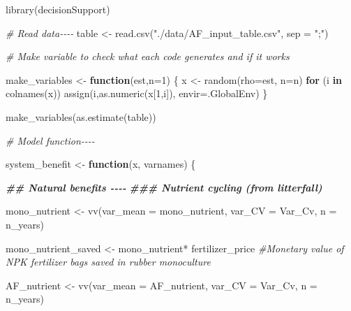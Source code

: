 \documentclass[
]{article}
\newenvironment{Shaded}{\begin{snugshade}}{\end{snugshade}}
\newcommand{\AttributeTok}[1]{\textcolor[rgb]{0.77,0.63,0.00}{#1}}
\newcommand{\CommentTok}[1]{\textcolor[rgb]{0.56,0.35,0.01}{\textit{#1}}}
\newcommand{\ControlFlowTok}[1]{\textcolor[rgb]{0.13,0.29,0.53}{\textbf{#1}}}
\newcommand{\DecValTok}[1]{\textcolor[rgb]{0.00,0.00,0.81}{#1}}
\newcommand{\DocumentationTok}[1]{\textcolor[rgb]{0.56,0.35,0.01}{\textbf{\textit{#1}}}}
\newcommand{\FunctionTok}[1]{\textcolor[rgb]{0.00,0.00,0.00}{#1}}
\newcommand{\NormalTok}[1]{#1}
\newcommand{\OtherTok}[1]{\textcolor[rgb]{0.56,0.35,0.01}{#1}}
\newcommand{\SpecialCharTok}[1]{\textcolor[rgb]{0.00,0.00,0.00}{#1}}
\newcommand{\StringTok}[1]{\textcolor[rgb]{0.31,0.60,0.02}{#1}}
\begin{document}
\begin{Shaded}
\begin{Highlighting}[]
\FunctionTok{library}\NormalTok{(decisionSupport)}

\CommentTok{\# Read data{-}{-}{-}{-}}
\NormalTok{table }\OtherTok{\textless{}{-}} \FunctionTok{read.csv}\NormalTok{(}\StringTok{"./data/AF\_input\_table.csv"}\NormalTok{, }\AttributeTok{sep =} \StringTok{";"}\NormalTok{)}

\CommentTok{\# Make variable to check what each code generates and if it works}

\NormalTok{make\_variables }\OtherTok{\textless{}{-}} \ControlFlowTok{function}\NormalTok{(est,}\AttributeTok{n=}\DecValTok{1}\NormalTok{) \{ }
\NormalTok{   x }\OtherTok{\textless{}{-}} \FunctionTok{random}\NormalTok{(}\AttributeTok{rho=}\NormalTok{est, }\AttributeTok{n=}\NormalTok{n)}
    \ControlFlowTok{for}\NormalTok{ (i }\ControlFlowTok{in} \FunctionTok{colnames}\NormalTok{(x)) }\FunctionTok{assign}\NormalTok{(i,}\FunctionTok{as.numeric}\NormalTok{(x[}\DecValTok{1}\NormalTok{,i]), }\AttributeTok{envir=}\NormalTok{.GlobalEnv)}
\NormalTok{  \}}

\FunctionTok{make\_variables}\NormalTok{(}\FunctionTok{as.estimate}\NormalTok{(table))}


\CommentTok{\# Model function{-}{-}{-}{-}}

\NormalTok{system\_benefit }\OtherTok{\textless{}{-}} \ControlFlowTok{function}\NormalTok{(x, varnames) \{}

\DocumentationTok{\#\# Natural benefits {-}{-}{-}{-}}
 \DocumentationTok{\#\#\# Nutrient cycling (from litterfall)}

\NormalTok{mono\_nutrient }\OtherTok{\textless{}{-}} \FunctionTok{vv}\NormalTok{(}\AttributeTok{var\_mean =}\NormalTok{ mono\_nutrient,}
                            \AttributeTok{var\_CV =}\NormalTok{ Var\_Cv,}
                            \AttributeTok{n =}\NormalTok{ n\_years) }

\NormalTok{mono\_nutrient\_saved }\OtherTok{\textless{}{-}}\NormalTok{ mono\_nutrient}\SpecialCharTok{*}\NormalTok{ fertilizer\_price  }\CommentTok{\#Monetary value of NPK fertilizer bags saved in rubber monoculture}

\NormalTok{AF\_nutrient }\OtherTok{\textless{}{-}} \FunctionTok{vv}\NormalTok{(}\AttributeTok{var\_mean =}\NormalTok{ AF\_nutrient,}
                            \AttributeTok{var\_CV =}\NormalTok{ Var\_Cv,}
                            \AttributeTok{n =}\NormalTok{ n\_years)}


\end{Highlighting}
\end{Shaded}
\end{document}
